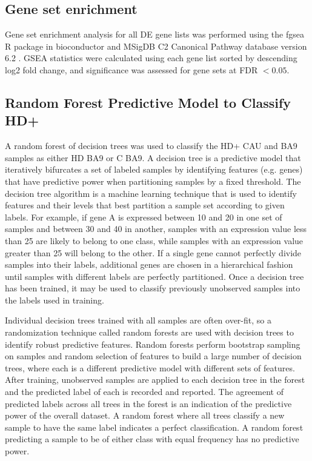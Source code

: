 \documentclass[fleqn,10pt,table]{wlscirep}
\begin{document}

\subsection{Gene set enrichment}

Gene set enrichment analysis for all DE gene lists was performed using the fgsea \cite{Sergushichev2016-hz} R package in bioconductor \cite{Huber2015-xa} and MSigDB C2 Canonical Pathway database version 6.2 \cite{Subramanian2005-tj,Liberzon2011-ax}.
GSEA statistics were calculated using each gene list sorted by descending log2 fold change, and significance was assessed for gene sets at FDR $< 0.05$.

\subsection{Random Forest Predictive Model to Classify HD+}

A random forest of decision trees was used to classify the HD+ CAU and BA9 samples as either HD BA9 or C BA9.
A decision tree is a predictive model that iteratively bifurcates a set of labeled samples by identifying features (e.g. genes) that have predictive power when partitioning samples by a fixed threshold.
The decision tree algorithm is a machine learning technique that is used to identify features and their levels that best partition a sample set according to given labels.
For example, if gene A is expressed between 10 and 20 in one set of samples and between 30 and 40 in another, samples with an expression value less than 25 are likely to belong to one class, while samples with an expression value greater than 25 will belong to the other.
If a single gene cannot perfectly divide samples into their labels, additional genes are chosen in a hierarchical fashion until samples with different labels are perfectly partitioned.
Once a decision tree has been trained, it may be used to classify previously unobserved samples into the labels used in training.

Individual decision trees trained with all samples are often over-fit, so a randomization technique called random forests are used with decision trees to identify robust predictive features.
Random forests perform bootstrap sampling on samples and random selection of features to build a large number of decision trees, where each is a different predictive model with different sets of features.
After training, unobserved samples are applied to each decision tree in the forest and the predicted label of each is recorded and reported.
The agreement of predicted labels across all trees in the forest is an indication of the predictive power of the overall dataset.
A random forest where all trees classify a new sample to have the same label indicates a perfect classification.
A random forest predicting a sample to be of either class with equal frequency has no predictive power.
\end{document}
